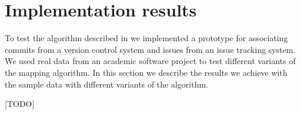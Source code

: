 \section{Implementation results}
\label{sec:implementation_results}
To test the algorithm described in  we implemented a prototype for associating commits from a version control system and issues from an issue tracking system.
We used real data from an academic software project to test different variants of the mapping algorithm.
In this section we describe the results we achieve with the sample data with different variants of the algorithm.

[TODO]